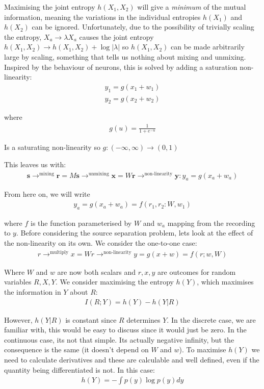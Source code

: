 \documentclass[11pt,a4paper,titlepage,dvipsnames,cmyk]{scrartcl}
\begin{document}
Maximising the joint entropy $h(X_1,X_2)$ will give a \textit{minimum} of the mutual information, meaning the variations in the individual entropies $h(X_1)$ and $h(X_2)$ can be ignored. Unfortunately, due to the possibility of trivially scaling the entropy, $X_a \rightarrow \lambda X_a$ causes the joint entropy $h(X_1, X_2) \rightarrow h(X_1,X_2) + \log |\lambda|$ so $h(X_1,X_2)$ can be made arbitrarily large by scaling, something that tells us nothing about mixing and unmixing. Inspired by the behaviour of neurons, this is solved by adding a saturation non-linearity:
\begin{align*}
y_1 = g(x_1 + w_1) \\
y_2 = g(x_2 + w_2)
\end{align*}

where
\begin{align*}
g(u) = \frac{1}{1+e^{-u}}
\end{align*}

Is a saturating non-linearity so $g : (-\infty, \infty) \rightarrow (0,1)$

This leaves us with:
\begin{align*}
\mathbf{s} \rightarrow^\text{mixing} \mathbf{r} = M\mathbf{s} \rightarrow^\text{unmixing} \mathbf{x} = W\mathbf{r} \rightarrow^\text{non-linearity} \mathbf{y} : y_a = g(x_a + w_a)
\end{align*}

From here on, we will write
\begin{align*}
y_a = g(x_a + w_a) = f(r_1,r_2:W,w_1)
\end{align*}

where $f$ is the function parameterised by $W$ and $w_a$ mapping from the recording to $y$. Before considering the source separation problem, lets look at the effect of the non-linearity on its own. We consider the one-to-one case:
\begin{align*}
r \rightarrow^\text{multiply} x = Wr \rightarrow^\text{non-linearity} y = g(x + w) = f(r;w,W)
\end{align*}

Where $W$ and $w$ are now both scalars and $r,x,y$ are outcomes for random variables $R,X,Y$. We consider maximising the entropy $h(Y)$, which maximises the information in $Y$ about $R$:
\begin{align*}
I(R;Y) = h(Y) - h(Y|R)
\end{align*}

However, $h(Y|R)$ is constant since $R$ determines $Y$. In the discrete case, we are familiar with, this would be easy to discuss since it would just be zero. In the continuous case, its not that simple. Its actually negative infinity, but the consequence is the same (it doesn't depend on $W$ and $w$). To maximise $h(Y)$ we need to calculate derivatives and these are calculable and well defined, even if the quantity being differentiated is not. In this case:
\begin{align*}
h(Y) = - \int p(y) \log p(y) dy
\end{align*}
\end{document}
